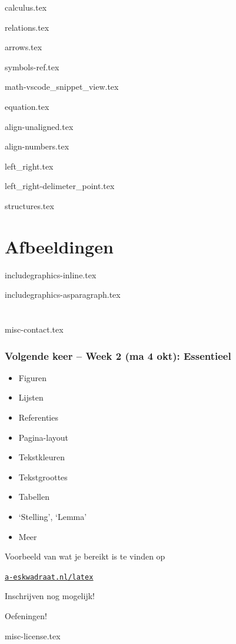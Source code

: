 \documentclass{cursuspresentatie}
\def\importslide#1#2{%
	{#2}
}
\begin{document}
\importslide{math}{calculus.tex}

\importslide{math}{relations.tex}
\importslide{math}{arrows.tex}
\importslide{math}{symbols-ref.tex}

\importslide{math}{math-vscode_snippet_view.tex}

\importslide{math}{equation.tex}

\importslide{math}{align-unaligned.tex}


\importslide{math}{align-numbers.tex}

\importslide{math}{left_right.tex}
\importslide{math}{left_right-delimeter_point.tex}

\importslide{math}{structures.tex}

\section{Afbeeldingen}


\importslide{images}{includegraphics-inline.tex}
\importslide{images}{includegraphics-asparagraph.tex}

\section{\texorpdfstring{}{Misc}}

\importslide{misc}{misc-contact.tex}

\begin{frame}
	\frametitle{Volgende keer -- Week 2 (ma 4 okt): Essentieel}

	\begin{multicols}{2}
		\begin{itemize}
			\item Figuren
			\item Lijsten
			\item Referenties
			\item Pagina-layout
			\item Tekstkleuren
			\item Tekstgroottes
			\item Tabellen
			\item `Stelling', `Lemma'
			\item Meer
		\end{itemize}\par
		\vfill
		\leavevmode
	\end{multicols}

	Voorbeeld van wat je bereikt is te vinden op
	\begin{center}
		\href{https://a-eskwadraat.nl/latex}{\ul{\texttt{a-eskwadraat.nl/latex}}}
	\end{center}

	\medskip
	Inschrijven nog mogelijk!
\end{frame}

\begin{frame}
	Oefeningen!
\end{frame}

\ifishandout
	\importslide{misc}{misc-license.tex}
\fi
	
\end{document}
